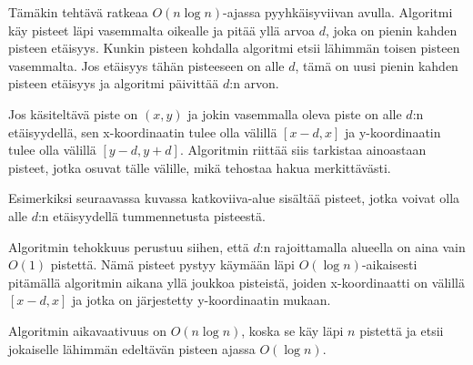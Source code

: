 Tämäkin tehtävä ratkeaa
$O(n \log n)$-ajassa pyyhkäisyviivan avulla.
Algoritmi käy pisteet läpi vasemmalta oikealle
ja pitää yllä arvoa $d$,
joka on pienin kahden
pisteen etäisyys.
Kunkin pisteen kohdalla algoritmi
etsii lähimmän toisen pisteen vasemmalta.
Jos etäisyys tähän pisteeseen on alle $d$,
tämä on uusi pienin kahden pisteen etäisyys
ja algoritmi päivittää $d$:n arvon.

Jos käsiteltävä piste on $(x,y)$
ja jokin vasemmalla oleva piste on
alle $d$:n etäisyydellä,
sen x-koordinaatin
tulee olla välillä $[x-d,x]$
ja y-koordinaatin tulee olla välillä $[y-d,y+d]$.
Algoritmin riittää siis tarkistaa
ainoastaan pisteet, jotka osuvat tälle välille,
mikä tehostaa hakua merkittävästi.

Esimerkiksi seuraavassa kuvassa
katkoviiva-alue sisältää pisteet,
jotka voivat olla alle $d$:n etäisyydellä
tummennetusta pisteestä.
\\
\begin{center}
\end{center}

Algoritmin tehokkuus perustuu siihen,
että $d$:n rajoittamalla alueella
on aina vain $O(1)$ pistettä.
Nämä pisteet pystyy käymään läpi
$O(\log n)$-aikaisesti
pitämällä algoritmin aikana yllä joukkoa pisteistä,
joiden x-koordinaatti on välillä $[x-d,x]$
ja jotka on järjestetty y-koordinaatin mukaan.

Algoritmin aikavaativuus on $O(n \log n)$,
koska se käy läpi $n$ pistettä
ja etsii jokaiselle lähimmän
edeltävän pisteen ajassa $O(\log n)$.

